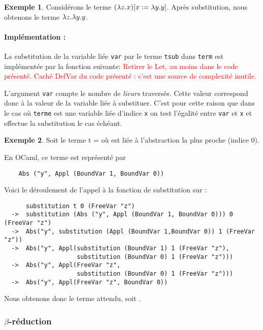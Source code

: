 \documentclass {article}
\newcommand{\codefrom}[3]
           {}
\theoremstyle{definition}
\newtheorem{example}{Exemple}
\theoremstyle{remark}
\newcommand{\todo}[1]{\textcolor{red}{#1}}
\newcommand{\fun}[1]{\lstinline!#1!}
\begin{document}
\begin{example}
  Considérons le terme $(\lambda z. x)[x := \lambda y. y]$. Après substitution, nous obtenons le terme $\lambda z. \lambda y. y$.
\end{example}


\paragraph{Implémentation :} 
La substitution de la variable liée \lstinline!var! par le terme
\lstinline!tsub! dans \lstinline!term! est implémentée par la fonction suivante:
\todo{Retirer le Let, au moins dans le code présenté. Caché DefVar du code présenté : c'est une source de complexité inutile.}
%
\codefrom{untyped}{lambda}{substitution}

L'argument \fun{var} compte le nombre de \emph{lieurs} traversés.
Cette valeur correspond donc à la valeur de la variable liée à substituer. C'est pour cette
raison que dans le cas où \fun{terme} est une variable liée d'indice \fun{x} on test l'égalité entre 
\fun{var} et \fun{x} et effectue la substitution le cas échéant.


\begin{example}
  Soit le terme t =  où  est liée à
  l'abstraction la plus proche (indice 0).

  En OCaml, ce terme est représenté par 
  \begin{lstlisting}
    Abs ("y", Appl (BoundVar 1, BoundVar 0))
  \end{lstlisting}

  Voici le déroulement de l'appel à la fonction de substitution sur  :
  \begin{lstlisting}
      substitution t 0 (FreeVar "z")
  ->  substitution (Abs ("y", Appl (BoundVar 1, BoundVar 0))) 0 (FreeVar "z")
  ->  Abs("y", substitution (Appl (BoundVar 1,BoundVar 0)) 1 (FreeVar "z"))
  ->  Abs("y", Appl(substitution (BoundVar 1) 1 (FreeVar "z"), 
                    substitution (BoundVar 0) 1 (FreeVar "z")))
  ->  Abs("y", Appl(FreeVar "z", 
                    substitution (BoundVar 0) 1 (FreeVar "z")))
  ->  Abs("y", Appl(FreeVar "z", BoundVar 0))
  \end{lstlisting}

  Nous obtenons donc le terme attendu, soit .
\end{example}

\subsubsection{$\beta$-réduction}
\label{reduction}
\end{document}
